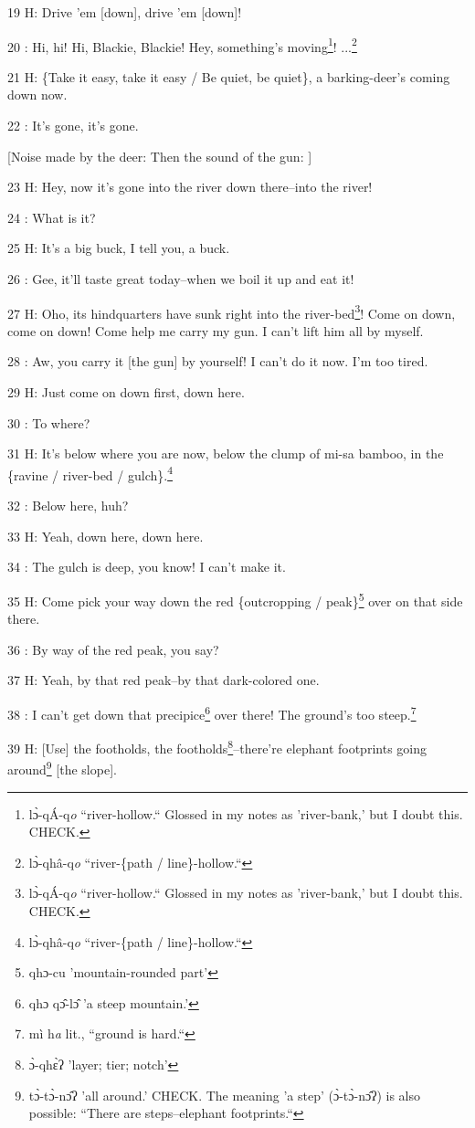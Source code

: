 19 H: Drive 'em [down], drive 'em [down]!

20  : Hi, hi! Hi, Blackie, Blackie! Hey, something's moving\footnote{lɔ̀-qÁ-q\emph{o} ``river-hollow.`` Glossed in my notes as 'river-bank,' but I doubt this. CHECK.}! ...\footnote{lɔ̀-qhâ-q\emph{o} ``river-\{path / line\}-hollow.``}

21 H: \{Take it easy, take it easy / Be quiet, be quiet\}, a barking-deer's coming
down now.

22  : It's gone, it's gone.

[Noise made by the deer: Then the sound of the gun: ]

23 H: Hey, now it's gone into the river down there--into the river!

24  : What is it?

25 H: It's a big buck, I tell you, a buck.

26  : Gee, it'll taste great today--when we boil it up and eat it!

27 H: Oho, its hindquarters have sunk right into the river-bed\footnote{lɔ̀-qÁ-q\emph{o} ``river-hollow.`` Glossed in my notes as 'river-bank,' but I doubt this. CHECK.}! Come on down,
come on down! Come help me carry my gun. I can't lift him all by myself.

28  : Aw, you carry it [the gun] by yourself! I can't do it now. I'm too tired.

29 H: Just come on down first, down here.

30  : To where?

31 H: It's below where you are now, below the clump of mi-sa bamboo, in the \{ravine
/ river-bed / gulch\}.\footnote{lɔ̀-qhâ-q\emph{o} ``river-\{path / line\}-hollow.``}

32  : Below here, huh?

33 H: Yeah, down here, down here.

34  : The gulch is deep, you know! I can't make it.

35 H: Come pick your way down the red \{outcropping / peak\}\footnote{qhɔ-cu 'mountain-rounded part'} over on that side
there.

36  : By way of the red peak, you say?

37 H: Yeah, by that red peak--by that dark-colored one.

38  : I can't get down that precipice\footnote{qhɔ qɔ̂-lɔ̂ 'a steep mountain.'} over there! The ground's too steep.\footnote{mì h\emph{a} lit., ``ground is hard.``}

39 H: [Use] the footholds, the footholds\footnote{ɔ̀-qhɛ̀ʔ 'layer; tier; notch'}--there're elephant footprints going
around\footnote{tɔ̀-tɔ̀-nɔ̂ʔ 'all around.' CHECK. The meaning 'a step' (ɔ̀-tɔ̀-nɔ̂ʔ) is also possible: ``There are steps--elephant footprints.``} [the slope].

